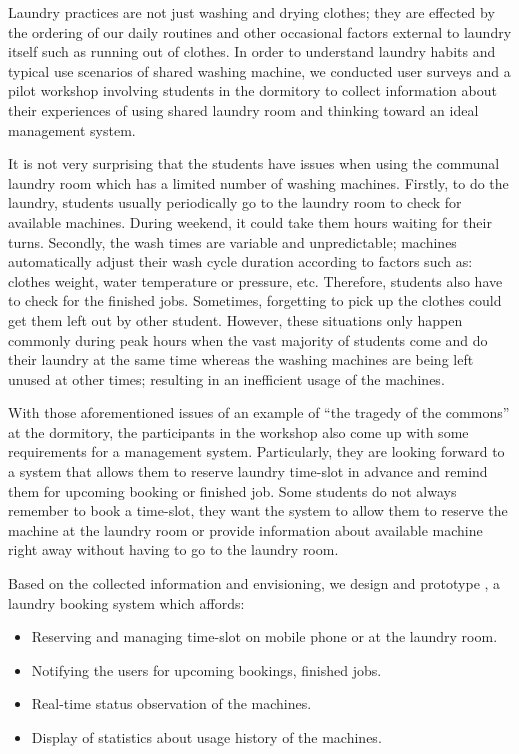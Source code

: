 Laundry practices are not just washing and drying clothes; they are effected by the ordering of
our daily routines \cite{shove2010beyond} and other occasional factors external to laundry itself such as running out of clothes. In order to understand laundry habits and typical use scenarios of shared washing machine, we conducted user surveys and a pilot workshop involving students in the dormitory to collect information about their experiences of using shared laundry room and thinking toward an ideal management system.

It is not very surprising that the students have issues when using the communal laundry room which has a limited number of washing machines. Firstly, to do the laundry, students usually periodically go to the laundry room to check for available machines. During weekend, it could take them hours waiting for their turns. Secondly, the wash times are variable and unpredictable; machines automatically adjust their wash cycle duration according to factors such as: clothes weight, water temperature or pressure, etc. Therefore, students also have to check for the finished jobs. Sometimes, forgetting to pick up the clothes could get them left out by other student. However, these situations only happen commonly during peak hours when the vast majority of students come and do their laundry at the same time whereas the washing machines are being left unused at other times; resulting in an inefficient usage of the machines.

With those aforementioned issues of an example of ``the tragedy of the commons'' at the dormitory, the participants in the workshop also come up with some requirements for a management system. Particularly, they are looking forward to a system that allows them to reserve laundry time-slot in advance and remind them for upcoming booking or finished job. Some students do not always remember to book a time-slot, they want the system to allow them to reserve the machine at the laundry room or provide information about available machine right away without having to go to the laundry room.

Based on the collected information and envisioning, we design and prototype {\toolname}, a laundry booking system which affords:
\begin{itemize}
\item Reserving and managing time-slot on mobile phone or at the laundry room.
\item Notifying the users for upcoming bookings, finished jobs.
\item Real-time status observation of the machines.
\item Display of statistics about usage history of the machines.
\end{itemize}